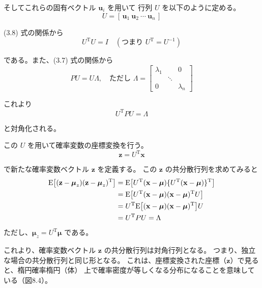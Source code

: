 \documentclass[10pt,a4paper,titlepage]{jreport} %
\begin{document}
そしてこれらの固有ベクトル $\mathbf{u}_i$ を用いて
行列 $U$ を以下のように定める。
\begin{equation}
U = [\,\mathbf{u}_1\ \mathbf{u}_2\ \cdots\ \mathbf{u}_n\,]
\end{equation}

(3.8) 式の関係から
\begin{equation}
U^{\mathrm{T}}U = I
\quad (\text{つまり } U^{\mathrm{T}} = U^{-1})
\end{equation}

である。また、(3.7) 式の関係から
\begin{equation}
PU = U\Lambda,
\quad
\text{ただし }
\Lambda =
\begin{bmatrix}
\lambda_1 &        & 0 \\
          & \ddots &   \\
0         &        & \lambda_n
\end{bmatrix}
\end{equation}

これより
\begin{equation}
U^{\mathrm{T}}PU = \Lambda
\end{equation}

と対角化される。

この $U$ を用いて確率変数の座標変換を行う。
\begin{equation}
\mathbf{z} = U^{\mathrm{T}}\mathbf{x}
\end{equation}

で新たな確率変数ベクトル $\mathbf{z}$ を定義する。
この $\mathbf{z}$ の共分散行列を求めてみると
\begin{align}
\mathrm{E}\big[(\mathbf{z}-\boldsymbol{\mu}_z)(\mathbf{z}-\boldsymbol{\mu}_z)^{\mathrm{T}}\big]
&= \mathrm{E}\big[U^{\mathrm{T}}(\mathbf{x}-\boldsymbol{\mu})
\{U^{\mathrm{T}}(\mathbf{x}-\boldsymbol{\mu})\}^{\mathrm{T}}\big] \notag \\
&= \mathrm{E}\big[U^{\mathrm{T}}(\mathbf{x}-\boldsymbol{\mu})
(\mathbf{x}-\boldsymbol{\mu})^{\mathrm{T}}U\big] \notag \\
&= U^{\mathrm{T}}\mathrm{E}\big[(\mathbf{x}-\boldsymbol{\mu})
(\mathbf{x}-\boldsymbol{\mu})^{\mathrm{T}}\big]U \notag \\
&= U^{\mathrm{T}}PU = \Lambda
\end{align}
ただし、$\boldsymbol{\mu}_z = U^{\mathrm{T}}\boldsymbol{\mu}$ である。

これより、確率変数ベクトル $\mathbf{z}$ の共分散行列は対角行列となる。
つまり、独立な場合の共分散行列と同じ形となる。
これは、座標変換された座標（$\mathbf{z}$）で見ると、楕円確率楕円（体）
上で確率密度が等しくなる分布になることを意味している（図8.4）。
\end{document}
